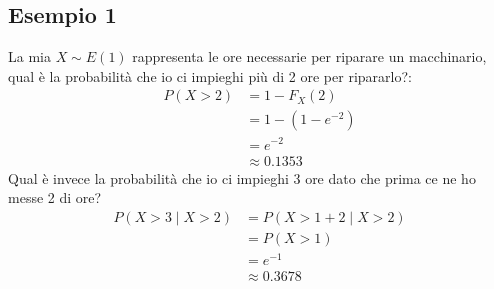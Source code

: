 \documentclass[11pt]{report}
\begin{document}
\subsection{Esempio 1}
La mia $X \sim E(1)$ rappresenta le ore necessarie per riparare un macchinario, qual è la probabilità che io ci impieghi più di 2 ore per ripararlo?:
\begin{equation}
    \begin{split}
        P(X > 2) & = 1 - F_X(2)\\
        & = 1 - (1 - e^{-2})\\
        & = e^{-2}\\
        & \approx 0.1353
    \end{split}
\end{equation}
Qual è invece la probabilità che io ci impieghi 3 ore dato che prima ce ne ho messe 2 di ore?
\begin{equation}
    \begin{split}
        P(X > 3 \mid X > 2) & = P(X > 1+2 \mid X > 2)\\
        & = P(X > 1)\\
        & = e^{-1}\\
        & \approx 0.3678
    \end{split}
\end{equation}
\end{document}
